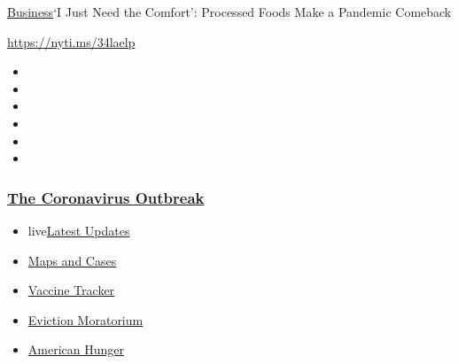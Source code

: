 \href{/section/business}{Business}\textbar{}`I Just Need the Comfort':
Processed Foods Make a Pandemic Comeback

\url{https://nyti.ms/34laelp}

\begin{itemize}
\item
\item
\item
\item
\item
\item
\end{itemize}

\hypertarget{the-coronavirus-outbreak}{%
\subsubsection{\texorpdfstring{\href{https://www.nytimes3xbfgragh.onion/news-event/coronavirus?name=styln-coronavirus-markets\&region=TOP_BANNER\&block=storyline_menu_recirc\&action=click\&pgtype=Article\&impression_id=014d9c20-f1cb-11ea-a821-81f048d561cf\&variant=undefined}{The
Coronavirus
Outbreak}}{The Coronavirus Outbreak}}\label{the-coronavirus-outbreak}}

\begin{itemize}
\tightlist
\item
  live\href{https://www.nytimes3xbfgragh.onion/2020/09/08/world/covid-19-coronavirus.html?name=styln-coronavirus-markets\&region=TOP_BANNER\&block=storyline_menu_recirc\&action=click\&pgtype=Article\&impression_id=014d9c21-f1cb-11ea-a821-81f048d561cf\&variant=undefined}{Latest
  Updates}
\item
  \href{https://www.nytimes3xbfgragh.onion/interactive/2020/us/coronavirus-us-cases.html?name=styln-coronavirus-markets\&region=TOP_BANNER\&block=storyline_menu_recirc\&action=click\&pgtype=Article\&impression_id=014d9c22-f1cb-11ea-a821-81f048d561cf\&variant=undefined}{Maps
  and Cases}
\item
  \href{https://www.nytimes3xbfgragh.onion/interactive/2020/science/coronavirus-vaccine-tracker.html?name=styln-coronavirus-markets\&region=TOP_BANNER\&block=storyline_menu_recirc\&action=click\&pgtype=Article\&impression_id=014d9c23-f1cb-11ea-a821-81f048d561cf\&variant=undefined}{Vaccine
  Tracker}
\item
  \href{https://www.nytimes3xbfgragh.onion/2020/09/02/your-money/eviction-moratorium-covid.html?name=styln-coronavirus-markets\&region=TOP_BANNER\&block=storyline_menu_recirc\&action=click\&pgtype=Article\&impression_id=014d9c24-f1cb-11ea-a821-81f048d561cf\&variant=undefined}{Eviction
  Moratorium}
\item
  \href{https://www.nytimes3xbfgragh.onion/interactive/2020/09/02/magazine/food-insecurity-hunger-us.html?name=styln-coronavirus-markets\&region=TOP_BANNER\&block=storyline_menu_recirc\&action=click\&pgtype=Article\&impression_id=014d9c25-f1cb-11ea-a821-81f048d561cf\&variant=undefined}{American
  Hunger}
\end{itemize}

